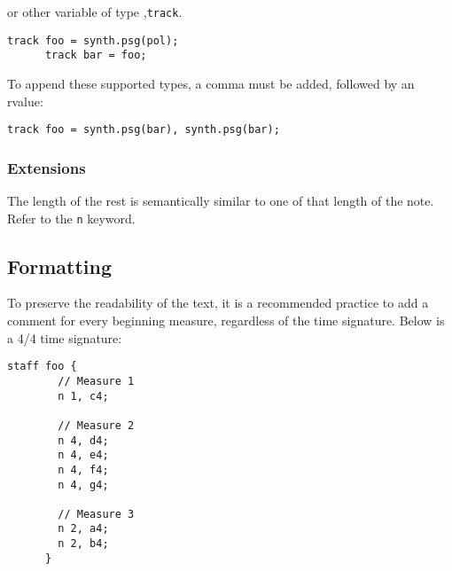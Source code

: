 or other variable of type ,\verb+track+.
\begin{Verbatim}[frame=single]
      track foo = synth.psg(pol);
      track bar = foo;
\end{Verbatim}

\np To append these supported types, a comma must be added, followed by an rvalue:
\begin{Verbatim}[frame=single]
      track foo = synth.psg(bar), synth.psg(bar);
\end{Verbatim}


\subsubsection{Extensions}

\np The length of the rest is semantically similar to one of that length
of the note. Refer to the \verb+n+ keyword.

\subsection{Formatting}
\label{formatting}
\np To preserve the readability of the text, it is a recommended practice to add a comment for every
beginning measure, regardless of the time signature. Below is a 4/4 time signature:
\begin{Verbatim}[frame=single]
      staff foo {
        // Measure 1
        n 1, c4;
  
        // Measure 2
        n 4, d4;
        n 4, e4;
        n 4, f4;
        n 4, g4;
  
        // Measure 3
        n 2, a4;
        n 2, b4;
      }
\end{Verbatim}


